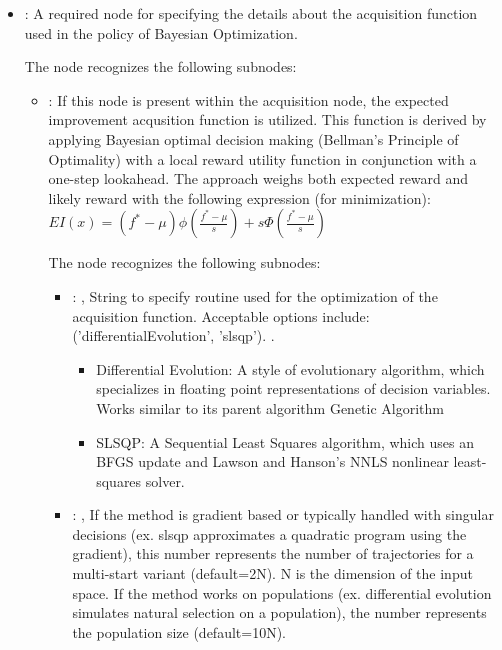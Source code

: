 \begin{itemize}
    \item {}:
      A required node for specifying                                                           the
      details about the acquisition function
      used in the policy of Bayesian Optimization.

      The  node recognizes the following subnodes:
      \begin{itemize}
        \item {}:
          If this node is present within the acquisition node,                         the expected
          improvement acqusition function is utilized.                         This function is
          derived by applying Bayesian optimal decision making (Bellman's Principle of Optimality)
          with a local reward utility function in conjunction with a one-step lookahead.
          The approach weighs both expected reward and likely reward with the
          following expression (for minimization):                         $EI(x) =
          (f^*-\mu)\phi(\frac{f^*-\mu}{s}) + s \Phi(\frac{f^*-\mu}{s})$

          The  node recognizes the following subnodes:
          \begin{itemize}
            \item {}: ,
              String to specify routine used for the optimization of the acquisition function.
              Acceptable options include: ('differentialEvolution', 'slsqp').
              .
              \begin{itemize}                                                  \item Differential
              Evolution: A style of evolutionary algorithm, which specializes in floating point
              representations of decision variables. Works similar to its parent algorithm Genetic
              Algorithm                                                  \item SLSQP: A Sequential
              Least Squares algorithm, which uses an BFGS update and
              Lawson and Hanson’s NNLS nonlinear least-squares solver.
              \end{itemize}

            \item {}: ,
              If the method is gradient based or typically handled with singular
              decisions (ex. slsqp approximates a quadratic program using the gradient), this number
              represents the number of trajectories for a multi-start variant (default=2N).
              N is the dimension of the input space.
              If the method works on populations (ex. differential evolution simulates
              natural selection on a population),
              the number represents the population size (default=10N).
          \end{itemize}


\end{itemize}
\end{itemize}

